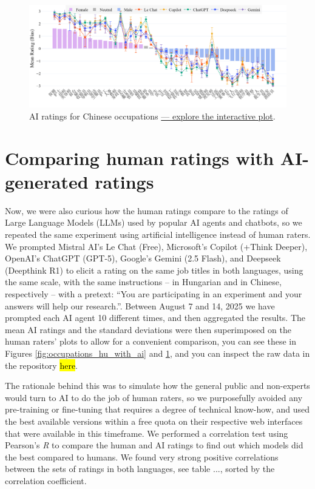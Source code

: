 \documentclass[11pt]{article}
\begin{document}
\begin{figure}[tbp]
  \centering
  \includegraphics[width=\linewidth]{../occupations_zh_with_ai}
  \caption{AI ratings for Chinese occupations \href{https://htmlpreview.github.io/?https://github.com/partigabor/occupational-bias/blob/main/occupations_zh_with_ai.html}{--- explore the interactive plot}.}
  \label{fig:occupations_zh_with_ai}
\end{figure}

\section{Comparing human ratings with AI-generated ratings}

Now, we were also curious how the human ratings compare to the ratings of Large Language Models (LLMs) used by popular AI agents and chatbots, so we repeated the same experiment using artificial intelligence instead of human raters. We prompted Mistral AI's Le Chat (Free), Microsoft's Copilot (+Think Deeper), OpenAI's ChatGPT (GPT-5), Google's Gemini (2.5 Flash), and Deepseek (Deepthink R1) to elicit a rating on the same job titles in both languages, using the same scale, with the same instructions -- in Hungarian and in Chinese, respectively -- with a pretext: ``You are participating in an experiment and your answers will help our research.''. Between August 7 and 14, 2025 we have prompted each AI agent 10 different times, and then aggregated the results. The mean AI ratings and the standard deviations were then superimposed on the human raters' plots to allow for a convenient comparison, you can see these in Figures \ref{fig:occupations_hu_with_ai} and \ref{fig:occupations_zh_with_ai}, and you can inspect the raw data in the repository \hl{here}.

The rationale behind this was to simulate how the general public and non-experts would turn to AI to do the job of human raters, so we purposefully avoided any pre-training or fine-tuning that requires a degree of technical know-how, and used the best available versions within a free quota on their respective web interfaces that were available in this timeframe. We performed a correlation test using Pearson's \textit{R} to compare the human and AI ratings to find out which models did the best compared to humans. We found very strong positive correlations between the sets of ratings in both languages, see table ..., sorted by the correlation coefficient.
\end{document}
